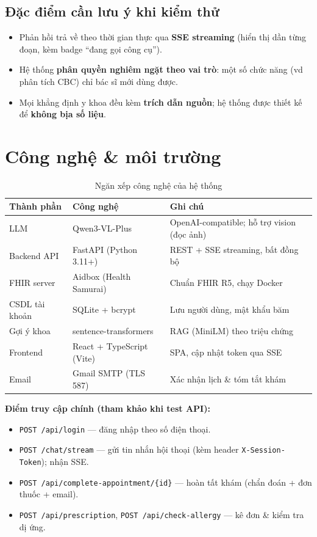\documentclass[a4paper,12pt]{article}
\begin{document}
\subsection{Đặc điểm cần lưu ý khi kiểm thử}
\begin{itemize}[leftmargin=1.4em]
  \item Phản hồi trả về theo thời gian thực qua \textbf{SSE streaming} (hiển thị dần từng đoạn, kèm badge ``đang gọi công cụ'').
  \item Hệ thống \textbf{phân quyền nghiêm ngặt theo vai trò}: một số chức năng (vd phân tích CBC) chỉ bác sĩ mới dùng được.
  \item Mọi khẳng định y khoa đều kèm \textbf{trích dẫn nguồn}; hệ thống được thiết kế để \textbf{không bịa số liệu}.
\end{itemize}

\section{Công nghệ \& môi trường}

\begin{table}[H]
\centering
\begin{tabular}{|l|l|p{6.2cm}|}
\hline
\textbf{Thành phần} & \textbf{Công nghệ} & \textbf{Ghi chú} \\
\hline
LLM            & Qwen3-VL-Plus            & OpenAI-compatible; hỗ trợ vision (đọc ảnh) \\ \hline
Backend API    & FastAPI (Python 3.11+)   & REST + SSE streaming, bất đồng bộ \\ \hline
FHIR server    & Aidbox (Health Samurai)  & Chuẩn FHIR R5, chạy Docker \\ \hline
CSDL tài khoản & SQLite + bcrypt          & Lưu người dùng, mật khẩu băm \\ \hline
Gợi ý khoa     & sentence-transformers    & RAG (MiniLM) theo triệu chứng \\ \hline
Frontend       & React + TypeScript (Vite)& SPA, cập nhật token qua SSE \\ \hline
Email          & Gmail SMTP (TLS 587)     & Xác nhận lịch \& tóm tắt khám \\ \hline
\end{tabular}
\caption{Ngăn xếp công nghệ của hệ thống}
\end{table}

\noindent\textbf{Điểm truy cập chính (tham khảo khi test API):}
\begin{itemize}[leftmargin=1.4em]
  \item \texttt{POST /api/login} --- đăng nhập theo số điện thoại.
  \item \texttt{POST /chat/stream} --- gửi tin nhắn hội thoại (kèm header \texttt{X-Session-Token}); nhận SSE.
  \item \texttt{POST /api/complete-appointment/\{id\}} --- hoàn tất khám (chẩn đoán + đơn thuốc + email).
  \item \texttt{POST /api/prescription}, \texttt{POST /api/check-allergy} --- kê đơn \& kiểm tra dị ứng.
\end{itemize}
\end{document}
